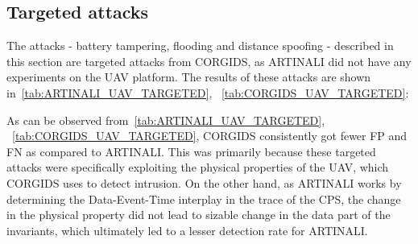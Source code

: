 \subsection{Targeted attacks}
The attacks - battery tampering, flooding and distance spoofing - described in this section are targeted attacks from CORGIDS, as ARTINALI did not have any experiments on the UAV platform.
The results of these attacks are shown in~\autoref{tab:ARTINALI_UAV_TARGETED}, ~\autoref{tab:CORGIDS_UAV_TARGETED}:

\begin{table}
\centering
  \caption{Results of intrusion detection by ARTINALI for Targeted attacks on UAV platform}
  \label{tab:ARTINALI_UAV_TARGETED}
\end{table}

\begin{table}
\centering
  \caption{Results of intrusion detection by CORGIDS for Targeted attacks on UAV platform}
  \label{tab:CORGIDS_UAV_TARGETED}
\end{table}

As can be observed from~\autoref{tab:ARTINALI_UAV_TARGETED}, ~\autoref{tab:CORGIDS_UAV_TARGETED}, CORGIDS consistently got fewer FP and FN as compared to ARTINALI. This was primarily because these targeted attacks were specifically exploiting the physical properties of the UAV, which CORGIDS uses to detect intrusion. On the other hand, as ARTINALI works by determining the Data-Event-Time interplay in the trace of the CPS, the change in the physical property did not lead to sizable change in the data part of the invariants, which ultimately led to a lesser detection rate for ARTINALI.

